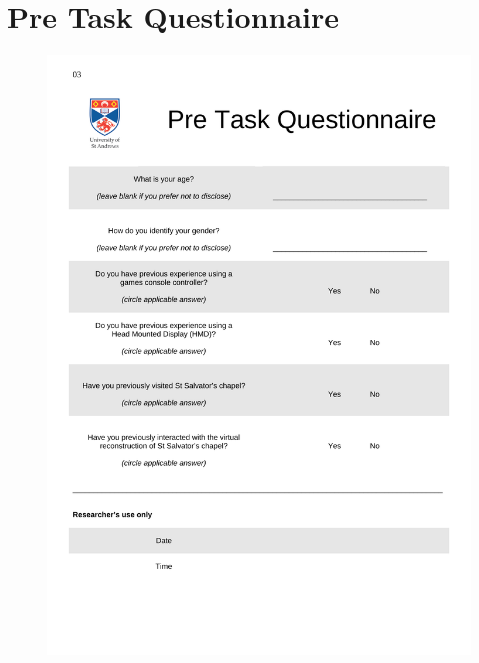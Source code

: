 \documentclass[oneside]{book}
\begin{document}
\chapter{Pre Task Questionnaire}
\label{pre_task_questionnaire}
\begin{figure}[h]
	\begin{center}
		\includegraphics[width=0.7\linewidth]{PDFs/Pre_Task_Questionnaire.pdf}
	\end{center}
\end{figure}
\end{document}

